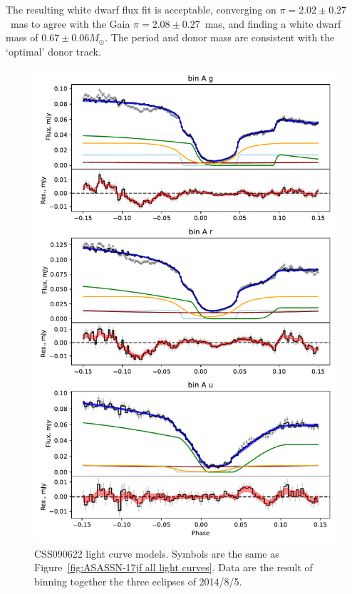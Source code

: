 The resulting white dwarf flux fit is acceptable, converging on $\pi = 2.02\pm0.27$~mas to agree with the Gaia $\pi=2.08\pm0.27$~mas, and finding a white dwarf mass of $0.67\pm0.06 M_\odot$. The period and donor mass are consistent with the `optimal' \citet{knigge11} donor track.

%     

\begin{figure}
    \centering
    \includegraphics[width=\textwidth]{figures/results/CSS090622/CSS090622_1.pdf}
    \caption{CSS090622 light curve models. Symbols are the same as Figure~\ref{fig:ASASSN-17jf all light curves}. Data are the result of binning together the three eclipses of 2014/8/5.}
    \label{fig:CSS090622 all light curves}
\end{figure}
